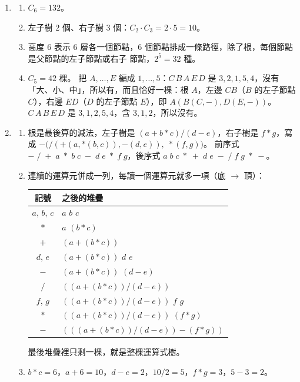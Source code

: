 \begin{enumerate}
\item
\begin{enumerate}
\item $C_6 = 132$。
\item 左子樹 $2$ 個、右子樹 $3$ 個：$C_2 \cdot C_3 = 2 \cdot 5 = 10$。
\item 高度 $6$ 表示 $6$ 層各一個節點，$6$ 個節點排成一條路徑，除了根，每個節點是父節點的左子節點或右子
節點，$2^5 = 32$ 種。
\item $C_5 = 42$ 棵。 把 $A, \ldots, E$ 編成 $1, \ldots, 5$：$C\,B\,A\,E\,D$ 是
$3, 2, 1, 5, 4$，沒有「大、小、中」，所以有，而且恰好一棵：根 $A$，左邊 $CB$（$B$
的左子節點 $C$），右邊 $ED$（$D$ 的左子節點 $E$），即 $A(B(C, -), D(E, -))$。
$C\,A\,B\,E\,D$ 是 $3, 1, 2, 5, 4$，含 $3, 1, 2$，所以沒有。
\end{enumerate}

\item
\begin{enumerate}
\item 根是最後算的減法，左子樹是 $(a + b * c) / (d - e)$，右子樹是 $f * g$，寫成
$-\bigl(/(+(a, *(b, c)), -(d, e)),\; *(f, g)\bigr)$。 前序式
$-\;/\;+\;a\;*\;b\;c\;-\;d\;e\;*\;f\;g$，後序式
$a\;b\;c\;*\;+\;d\;e\;-\;/\;f\;g\;*\;-$。
\item 連續的運算元併成一列，每讀一個運算元就多一項（底 $\to$ 頂）：
\begin{center}
\begin{tabular}{cl}
\toprule
記號 & 之後的堆疊 \\
\midrule
$a$, $b$, $c$ & $a$ \quad $b$ \quad $c$ \\
$*$ & $a$ \quad $(b * c)$ \\
$+$ & $(a + (b * c))$ \\
$d$, $e$ & $(a + (b * c))$ \quad $d$ \quad $e$ \\
$-$ & $(a + (b * c))$ \quad $(d - e)$ \\
$/$ & $((a + (b * c)) / (d - e))$ \\
$f$, $g$ & $((a + (b * c)) / (d - e))$ \quad $f$ \quad $g$ \\
$*$ & $((a + (b * c)) / (d - e))$ \quad $(f * g)$ \\
$-$ & $(((a + (b * c)) / (d - e)) - (f * g))$ \\
\bottomrule
\end{tabular}
\end{center}
最後堆疊裡只剩一棵，就是整棵運算式樹。
\item $b * c = 6$，$a + 6 = 10$，$d - e = 2$，$10 / 2 = 5$，$f * g = 3$，$5 - 3 = 2$。
\end{enumerate}

\end{enumerate}

